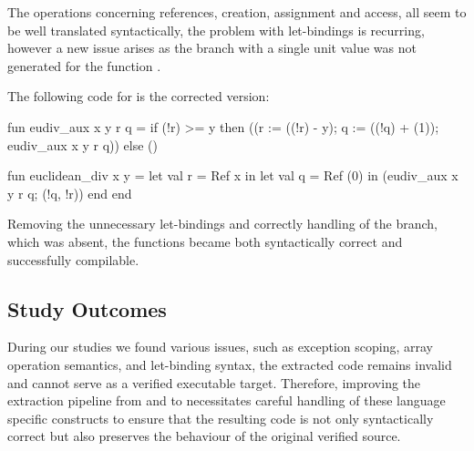 The operations concerning references, creation, assignment and access, all seem to be well translated syntactically, the problem with
let-bindings is recurring, however a new issue arises as the  branch with a single unit value was not generated for the 
function .

The following code for \cml is the corrected version:

\begin{cakeml}
fun eudiv_aux x y r q =
  if (!r) >= y
  then ((r := ((!r) - y); q := ((!q) + (1)); eudiv_aux x y r q))
  else ()

fun euclidean_div x y =
  let val r = Ref x in
  let val q = Ref (0) in (eudiv_aux x y r q; (!q, !r)) 
    end end
\end{cakeml}

Removing the unnecessary let-bindings and correctly handling of the  branch, which was absent, the functions became 
both syntactically correct and successfully compilable.

\subsection{Study Outcomes}

During our studies we found various issues, such as exception scoping, array operation semantics, and let-binding syntax, the extracted 
code remains invalid and cannot serve as a verified executable target. Therefore, improving the extraction pipeline from \ocaml and 
\gospel to \cml necessitates careful handling of these language specific constructs to ensure that the resulting code is not only 
syntactically correct but also preserves the behaviour of the original verified source.